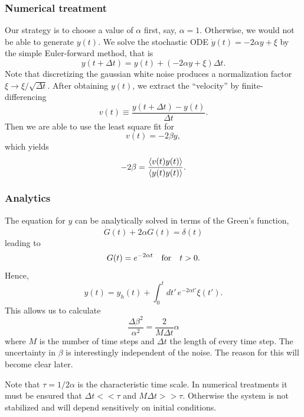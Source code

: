 \documentclass[11pt,a4paper]{article}
\begin{document}
\subsubsection{Numerical treatment}
Our strategy is to choose a value of $\alpha$ first, say, $\alpha = 1$. Otherwise, we would not be able to generate $y(t)$. We solve the stochastic ODE $\dot{y}(t) = -2\alpha y + \xi$ by the simple Euler-forward method, that is
\begin{equation}
    y(t+\Delta t) = y(t) + (-2\alpha y+\xi)\Delta t.
\end{equation}
Note that discretizing the gaussian white noise produces a normalization factor $\xi \rightarrow \xi/\sqrt{\Delta t}$. After obtaining $y(t)$, we extract the ``velocity'' by finite-differencing
\begin{equation}
    v(t) \equiv \frac{ y(t+\Delta t)-y(t)}{\Delta t}.
\end{equation}
Then we are able to use the least square fit for 
\begin{equation}
    v(t)=-2\beta y,
\end{equation}
which yields
\begin{equation}
    -2\beta = \frac{\expval{v(t)y(t)}}{\expval{y(t)y(t)}}.
\end{equation}

\subsubsection{Analytics}
The equation for $y$ can be analytically solved in terms of the Green's function,
\begin{equation}
   \dot{G}(t) + 2\alpha G(t) = \delta(t)
\end{equation}
leading to
\begin{equation}
   G(t) = e^{-2\alpha t} \qq{for} t>0.
\end{equation}
Hence,
\begin{equation}
   y(t) = y_h(t) + \int_0^t dt'\, e^{-2\alpha t'} \xi(t').
\end{equation}
This allows us to calculate
\begin{equation}
   \frac{\Delta \beta^2}{\alpha^2} = \frac{2}{M\Delta t}\alpha
   \label{eqn:analytic1}
\end{equation}
where $M$ is the number of time steps and $\Delta t$ the length of every time step. The uncertainty in $\beta$ is interestingly independent of the noise. The reason for this will become clear later.

Note that $\tau=1/2\alpha$ is the characteristic time scale. In numerical treatments it must be ensured that $\Delta t<< \tau$ and $M\Delta t >> \tau$. Otherwise the system is not stabilized and will depend sensitively on initial conditions.
\end{document}
